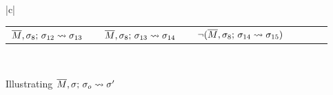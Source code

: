 \begin{figure}[htb]
\begin{tabular}{|c|}
 \hline %
 \\
\hline
\begin{tabular}{lclclclcl}
 $\leadstoBounded  {\Mtwo} {\sigma_{12}} {\sigma_8}  {\sigma_{13}} $  & &   $\leadstoBounded  {\Mtwo} {\sigma_{13}}  {\sigma_{8}}  {\sigma_{14}} $ &  &
$\notLeadstoBounded  {\Mtwo} {\sigma_{14}} {\sigma_8}  {\sigma_{15}} $ & &  
\\

\end{tabular}
\\
\hline
\end{tabular}
   \caption{Illustrating   $\leadstoBounded  {\Mtwo} {\sigma_o} {\sigma}  {\sigma'}$
    }
   \label{fig:UpSemanticsBounded}
 \end{figure}
 
